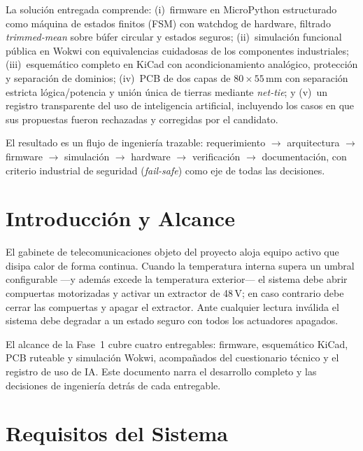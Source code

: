 \documentclass[11pt,letterpaper]{article}
\begin{document}
La solución entregada comprende: (i)~firmware en MicroPython estructurado como máquina de
estados finitos (FSM) con watchdog de hardware, filtrado \emph{trimmed-mean} sobre búfer
circular y estados seguros; (ii)~simulación funcional pública en Wokwi con equivalencias
cuidadosas de los componentes industriales; (iii)~esquemático completo en KiCad con
acondicionamiento analógico, protección y separación de dominios; (iv)~PCB de dos capas
de $80\times55$\,mm con separación estricta lógica/potencia y unión única de tierras
mediante \emph{net-tie}; y (v)~un registro transparente del uso de inteligencia
artificial, incluyendo los casos en que sus propuestas fueron rechazadas y corregidas
por el candidato.

El resultado es un flujo de ingeniería trazable: requerimiento $\rightarrow$ arquitectura
$\rightarrow$ firmware $\rightarrow$ simulación $\rightarrow$ hardware $\rightarrow$
verificación $\rightarrow$ documentación, con criterio industrial de seguridad
(\emph{fail-safe}) como eje de todas las decisiones.

\clearpage
\tableofcontents
\clearpage

\section{Introducción y Alcance}
El gabinete de telecomunicaciones objeto del proyecto aloja equipo activo que disipa
calor de forma continua. Cuando la temperatura interna supera un umbral configurable
---y además excede la temperatura exterior--- el sistema debe abrir compuertas
motorizadas y activar un extractor de 48\,V; en caso contrario debe cerrar las
compuertas y apagar el extractor. Ante cualquier lectura inválida el sistema debe
degradar a un estado seguro con todos los actuadores apagados.

El alcance de la Fase~1 cubre cuatro entregables: firmware, esquemático KiCad,
PCB ruteable y simulación Wokwi, acompañados del cuestionario técnico y el registro
de uso de IA. Este documento narra el desarrollo completo y las decisiones de
ingeniería detrás de cada entregable.

\section{Requisitos del Sistema}
\end{document}
